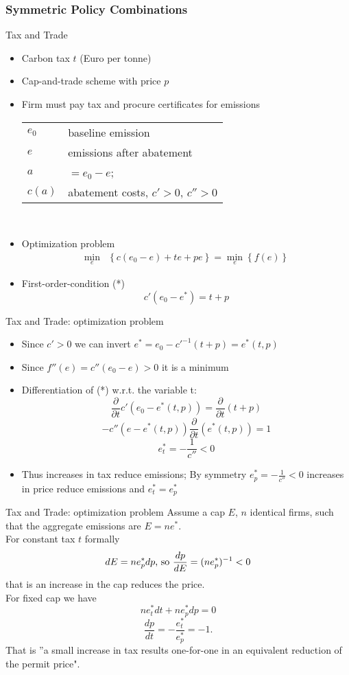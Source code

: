 \subsubsection{Symmetric Policy Combinations}


{Tax and Trade}
\begin{itemize}
\item <1-> Carbon tax $t$ (Euro per tonne)
\item <2-> Cap-and-trade scheme with price $p$
\item <3-> Firm must pay tax and procure certificates for emissions
\begin{tabular}{ll}
$e_0$ & baseline emission \\
$e$ & emissions after abatement \\
$a$ & $=e_0 - e$; \\
$c(a)$ & abatement costs, $c' > 0$, $c'' > 0$ \\
\end{tabular} \\
\item <4-> Optimization problem
\begin{align}
\min_{e} & \left\{c(e_0-e)+te+pe\right\} = \min_{e}\left\{f(e)\right\}
\end{align}
\item <5-> First-order-condition (*)
\[
c'(e_0-e^*)=t+p
\]
\end{itemize}




{Tax and Trade: optimization problem}
\begin{itemize}
\item <1-> Since $c'>0$ we can invert $e^*=e_0-c'^{-1}(t+p)=e^*(t,p)$ \\
\item <2-> Since $f''(e)=c''(e_0-e)>0$ it is a minimum \\
\item <3-> Differentiation of (*) w.r.t. the variable t:
\[
\frac{\partial}{\partial{t}}c'(e_0-e^*(t,p))=\frac{\partial}{\partial{t}}(t+p)
\]
\[
-c''(e-e^*(t,p)) \frac{\partial}{\partial{t}} (e^*(t,p))=1
\]
\[
e^*_t=-\frac{1}{c''} < 0
\]
\item <4-> Thus increases in tax reduce emissions; By symmetry $e^*_p = -\frac{1}{c''} < 0$ increases in price reduce emissions and $e^*_t=e^*_p$
\end{itemize}




{Tax and Trade: optimization problem}
Assume a cap $E$, $n$ identical firms, such that the aggregate emissions are $E=ne^*$. \\
For constant tax $t$ formally
\[
dE = ne^*_pdp \textnormal{, so } \frac{dp}{dE} = (ne^*_p)^{-1} < 0
\]
that is an increase in the cap reduces the price. \\
For fixed cap we have
\[
ne^*_tdt+ne^*_pdp=0
\]
\[
\frac{dp}{dt}=-\frac{e^*_t}{e^*_p}=-1.
\]
That is ''a small increase in tax results one-for-one in an equivalent reduction of the permit price". \\


